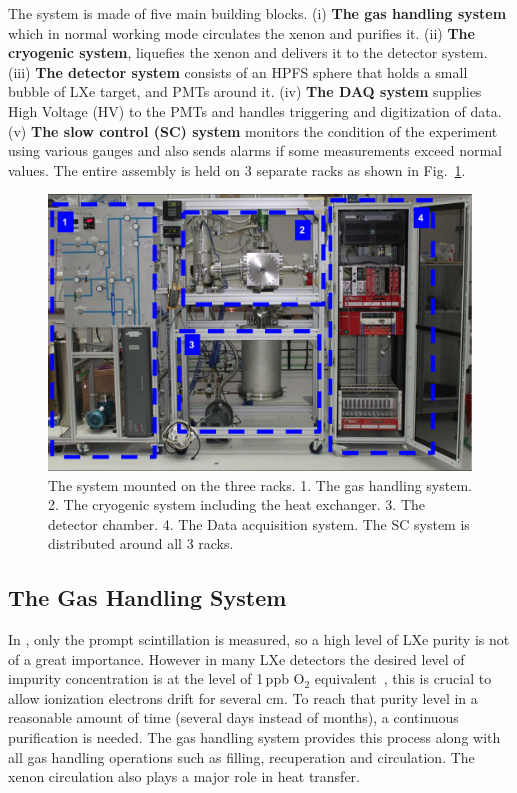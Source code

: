 The system is made of five main building blocks. (i) \textbf{The gas handling system} which in normal working mode circulates the xenon and purifies it. (ii) \textbf{The cryogenic system}, liquefies the xenon and 
delivers it to the detector system. (iii) \textbf{The detector system} consists of an HPFS sphere that holds a small bubble of LXe target, and PMTs around it. (iv) \textbf{The DAQ system} supplies High Voltage (HV) 
to the PMTs and handles triggering and digitization of data. (v) \textbf{The slow control (SC) system} monitors the condition of the experiment using various gauges and also sends alarms if some measurements exceed normal values. The entire assembly is held on 3 separate racks as shown in Fig.~\ref{fig:fulldet}.



\begin{figure}[h]
\centerline{\includegraphics[width=0.8\linewidth]{FullSys.png}}
\caption{The \direxeno system mounted on the three racks. 1. The gas handling system. 2. The cryogenic system including the heat exchanger. 3. The detector chamber. 4. The Data acquisition system. The SC system is distributed around all 3 racks.
\label{fig:fulldet}}
\end{figure}



\subsection{The Gas Handling System}
\label{subsec:gas}

In \direxeno, only the prompt scintillation is measured, so a high level of LXe purity is not of a great importance. However in many LXe detectors the desired level of impurity concentration is at the level of 1\,ppb O$_2$ equivalent~\cite{Aprile:2009dv}, this is crucial to allow 
ionization electrons drift for several cm. To reach that purity level in a reasonable amount of time (several days instead of months), 
a continuous purification is needed. The gas handling system provides this process along 
with all gas handling operations such as filling, recuperation and circulation. The xenon circulation also plays a major role in heat transfer.


